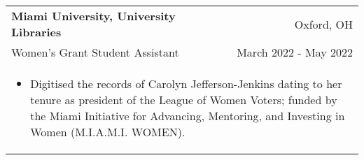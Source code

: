 \documentclass[letterpaper,10pt]{article} %
\begin{document}
\begin{tabular*}{\linewidth}{@{\extracolsep{\fill}} lr }
\textbf{Miami University, University Libraries} & \footnotesize{Oxford, OH}\\
\footnotesize{Women's Grant Student Assistant} & \footnotesize{March 2022 - May 2022}\\
\multicolumn{2}{p{\linewidth}}{
    \scriptsize{\vspace{-3.25mm}\begin{itemize}
        \item Digitised the records of Carolyn Jefferson-Jenkins dating to her tenure as president of the League of Women Voters; funded by the Miami Initiative for Advancing, Mentoring, and Investing in Women (M.I.A.M.I. WOMEN).
    \end{itemize}}
}\\


\end{tabular*}
\end{document}
